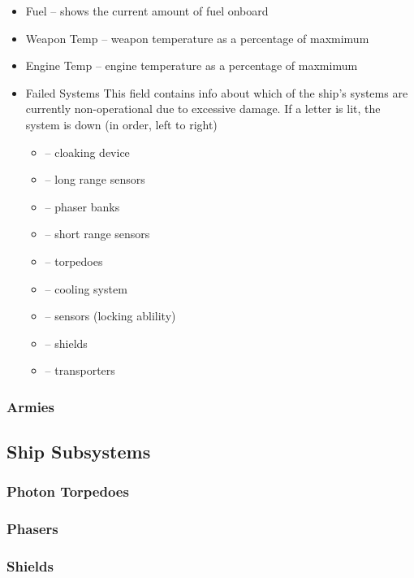 \begin{itemize}
\item Fuel -- shows the current amount of fuel onboard

\item Weapon Temp -- weapon temperature as a percentage of maxmimum

\item Engine Temp -- engine temperature as a percentage of maxmimum

\item Failed Systems
	This field contains info about which of the ship's systems are currently
	non-operational due to excessive damage.  If a letter is lit, the system
	is down (in order, left to right)

	\begin{itemize}

	\item {}-- cloaking device
	\item {}-- long range sensors
	\item {}-- phaser banks
	\item {}-- short range sensors 
	\item {}-- torpedoes
	\item {}-- cooling system
	\item {}-- sensors (locking ablility)
	\item {}-- shields
	\item {}-- transporters

	\end{itemize}
\end{itemize}

\subsubsection{Armies}
\subsection{Ship Subsystems}
\subsubsection{Photon Torpedoes}
\subsubsection{Phasers}
\subsubsection{Shields}
